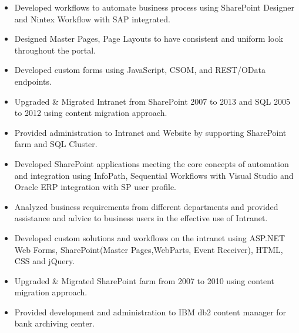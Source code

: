 \documentclass[10pt,a4paper]{altacv}
\begin{document}
\divider

\begin {itemize}
\item Developed workflows to automate business process using SharePoint Designer and Nintex Workflow with SAP integrated.
\item Designed Master Pages, Page Layouts to have consistent and uniform look throughout the portal.
\item  Developed custom forms using JavaScript, CSOM, and REST/OData endpoints. 
\end{itemize}

\divider

\begin {itemize}
\item 	Upgraded \& Migrated Intranet from SharePoint 2007 to 2013 and SQL 2005 to 2012 using content migration approach.
\item 	Provided administration to Intranet and Website by supporting SharePoint farm and SQL Cluster.
\item 	Developed SharePoint applications meeting the core concepts of automation and integration using InfoPath, Sequential Workflows with Visual Studio and Oracle ERP integration with SP user profile. 
\end{itemize}

\divider

\begin {itemize}
\item 	Analyzed business requirements from different departments and provided assistance and advice to business users in the effective use of Intranet.
\item 	Developed custom solutions and workflows on the intranet using ASP.NET Web Forms, SharePoint(Master Pages,WebParts, Event Receiver), HTML, CSS and jQuery.
\item Upgraded \& Migrated SharePoint farm from 2007 to 2010 using content migration approach. 
\item 	Provided development and administration to IBM db2 content manager for bank archiving center.

\end{itemize}
\divider
\end{document}
